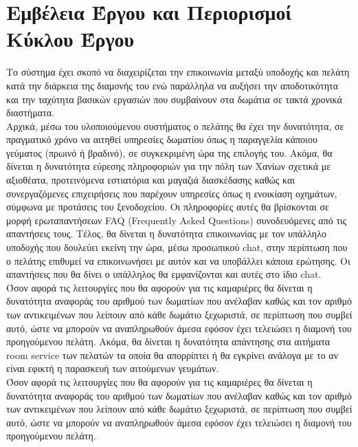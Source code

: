 \section{Εμβέλεια Έργου και Περιορισμοί Κύκλου Έργου}		
Το σύστημα έχει σκοπό να διαχειρίζεται την επικοινωνία μεταξύ υποδοχής και πελάτη κατά την διάρκεια 
της διαμονής του ενώ παράλληλα να αυξήσει την αποδοτικότητα και την ταχύτητα βασικών εργασιών 
που συμβαίνουν στα δωμάτια σε τακτά χρονικά διαστήματα.\\

\noindent
Αρχικά, μέσω του υλοποιούμενου συστήματος ο πελάτης θα έχει την δυνατότητα, σε πραγματικό χρόνο
να αιτηθεί υπηρεσίες δωματίου όπως η παραγγελία κάποιου γεύματος (πρωινό ή βραδινό), σε 
συγκεκριμένη ώρα της επιλογής του. Ακόμα, θα δίνεται η δυνατότητα εύρεσης πληροφοριών για την πόλη
των Χανίων σχετικά με αξιοθέατα, προτεινόμενα εστιατόρια και μαγαζιά διασκέδασης καθώς και  
συνεργαζόμενες επιχειρήσεις που παρέχουν υπηρεσίες όπως η ενοικίαση οχημάτων, σύμφωνα με 
προτάσεις του ξενοδοχείου. Οι πληροφορίες αυτές θα βρίσκονται σε μορφή ερωταπαντήσεων FAQ 
(Frequently Asked Questions) συνοδευόμενες από τις  απαντήσεις τους. Τέλος, θα δίνεται η δυνατότητα 
επικοινωνίας με τον υπάλληλο υποδοχής που δουλεύει εκείνη την ώρα, μέσω προσωπικού chat, στην 
περίπτωση που ο πελάτης επιθυμεί να επικοινωνήσει με αυτόν και να υποβάλλει κάποια ερώτησης. Οι 
απαντήσεις που θα δίνει ο υπάλληλος θα  εμφανίζονται και αυτές στο ίδιο chat. \\

\noindent
Όσον αφορά τις λειτουργίες που θα αφορούν για τις καμαριέρες θα δίνεται η δυνατότητα αναφοράς του
αριθμού των δωματίων που ανέλαβαν καθώς και τον αριθμό των αντικειμένων που λείπουν από κάθε 
δωμάτιο ξεχωριστά, σε περίπτωση που συμβεί αυτό, ώστε να μπορούν να αναπληρωθούν άμεσα εφόσον 
έχει τελειώσει η διαμονή του προηγούμενου πελάτη.  Ακόμα, θα δίνεται η δυνατότητα απάντησης στα
αιτήματα room service  των πελατών τα οποία θα απορρίπτει ή θα εγκρίνει ανάλογα με το αν είναι εφικτή
η παρασκευή των αιτούμενων γευμάτων.\\

\noindent
Όσον αφορά τις λειτουργίες που θα αφορούν για τις καμαριέρες θα δίνεται η δυνατότητα αναφοράς του
αριθμού των δωματίων που ανέλαβαν καθώς και τον αριθμό των αντικειμένων που λείπουν από κάθε 
δωμάτιο ξεχωριστά, σε περίπτωση που συμβεί αυτό, ώστε να μπορούν να αναπληρωθούν άμεσα εφόσον 
έχει τελειώσει η διαμονή του προηγούμενου πελάτη. \\

